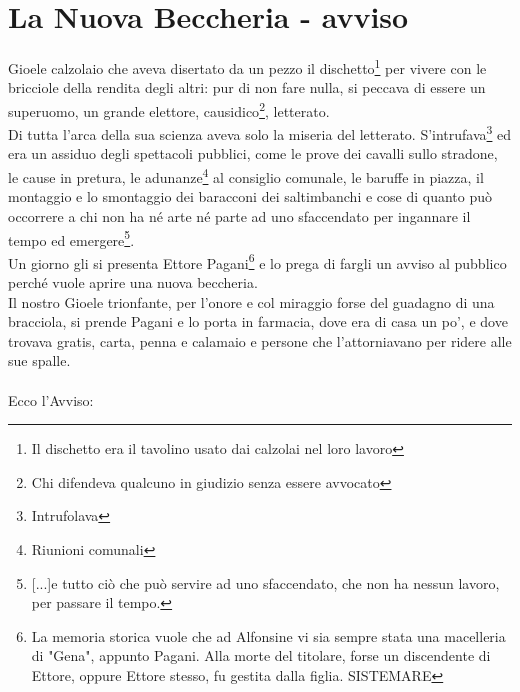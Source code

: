 
\chapter{La Nuova Beccheria - avviso}
Gioele calzolaio che aveva disertato da un pezzo il dischetto\footnote{Il dischetto era il tavolino usato dai calzolai nel loro lavoro} per vivere con le bricciole della rendita degli altri: pur di non fare nulla, si peccava di essere un superuomo, un grande elettore, causidico\footnote{Chi difendeva qualcuno in giudizio senza essere avvocato}, letterato.\\
Di tutta l'arca della sua scienza aveva solo la miseria del letterato. S'intrufava\footnote{Intrufolava} ed era un assiduo degli spettacoli pubblici, come le prove dei cavalli sullo stradone, le cause in pretura, le adunanze\footnote{Riunioni comunali} al consiglio comunale, le baruffe in piazza, il montaggio e lo smontaggio dei baracconi dei saltimbanchi e cose di quanto può occorrere a chi non ha né arte né parte ad uno sfaccendato per ingannare il tempo ed emergere\footnote{[...]e tutto ciò che può servire ad uno sfaccendato, che non ha nessun lavoro, per passare il tempo.}.\\
Un giorno gli si presenta Ettore Pagani\footnote{La memoria storica vuole che ad Alfonsine vi sia sempre stata una macelleria di "Gena", appunto Pagani. Alla morte del titolare, forse un discendente di Ettore, oppure Ettore stesso, fu gestita dalla figlia. SISTEMARE} e lo prega di fargli un avviso al pubblico perché vuole aprire una nuova beccheria. \\
Il nostro Gioele trionfante, per l'onore e col miraggio forse del guadagno di una bracciola, si prende Pagani e lo porta in farmacia, dove era di casa un po', e dove trovava gratis, carta, penna e calamaio e persone che l'attorniavano per ridere alle sue spalle.\\
\\
Ecco l'Avviso:

 \normalsize \normalfont 

